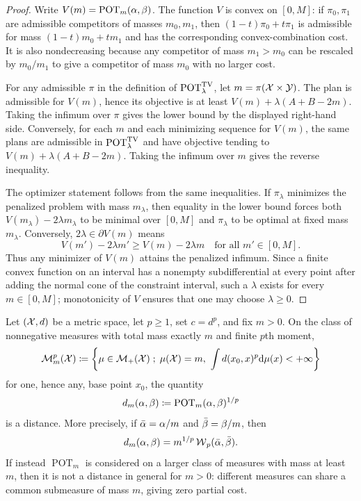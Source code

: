 \begin{proof}
	Write $V(m)=\operatorname{POT}_m(\alpha,\beta)$. The function $V$ is convex on $[0,M]$: if $\pi_0,\pi_1$ are admissible competitors of masses $m_0,m_1$, then $(1-t)\pi_0+t\pi_1$ is admissible for mass $(1-t)m_0+tm_1$ and has the corresponding convex-combination cost. It is also nondecreasing because any competitor of mass $m_1>m_0$ can be rescaled by $m_0/m_1$ to give a competitor of mass $m_0$ with no larger cost.

	For any admissible $\pi$ in the definition of $\operatorname{POT}^{\operatorname{TV}}_\lambda$, let $m=\pi(\mathcal{X}\times\mathcal{Y})$. The plan is admissible for $V(m)$, hence its objective is at least $V(m)+\lambda(A+B-2m)$. Taking the infimum over $\pi$ gives the lower bound by the displayed right-hand side. Conversely, for each $m$ and each minimizing sequence for $V(m)$, the same plans are admissible in $\operatorname{POT}^{\operatorname{TV}}_\lambda$ and have objective tending to $V(m)+\lambda(A+B-2m)$. Taking the infimum over $m$ gives the reverse inequality.

	The optimizer statement follows from the same inequalities. If $\pi_\lambda$ minimizes the penalized problem with mass $m_\lambda$, then equality in the lower bound forces both $V(m_\lambda)-2\lambda m_\lambda$ to be minimal over $[0,M]$ and $\pi_\lambda$ to be optimal at fixed mass $m_\lambda$. Conversely, $2\lambda\in\partial V(m)$ means
	\[
		V(m')-2\lambda m'\geq V(m)-2\lambda m
		\quad\text{for all }m'\in[0,M].
	\]
	Thus any minimizer of $V(m)$ attains the penalized infimum. Since a finite convex function on an interval has a nonempty subdifferential at every point after adding the normal cone of the constraint interval, such a $\lambda$ exists for every $m\in[0,M]$; monotonicity of $V$ ensures that one may choose $\lambda\geq0$.
\end{proof}

\begin{prop}\label{prop-partial-ot-metric-slice}
	Let $(\mathcal{X},d)$ be a metric space, let $p\geq1$, set $c=d^p$, and fix $m>0$. On the class of nonnegative measures with total mass exactly $m$ and finite $p$th moment,
	\[
		\mathcal M_m^p(\mathcal{X})\coloneqq
		\left\{ \mu\in\mathcal{M}_+(\mathcal{X}) \;;\; \mu(\mathcal{X})=m,\ \int d(x_0,x)^p\mathrm{d}\mu(x)<+\infty \right\}
	\]
	for one, hence any, base point $x_0$, the quantity
	\[
		d_m(\alpha,\beta)\coloneqq \operatorname{POT}_m(\alpha,\beta)^{1/p}
	\]
	is a distance. More precisely, if $\bar{\alpha}=\alpha/m$ and $\bar{\beta}=\beta/m$, then
	\[
		d_m(\alpha,\beta)=m^{1/p}\operatorname{\mathcal{W}}_p(\bar{\alpha},\bar{\beta}).
	\]
	If instead $\operatorname{POT}_m$ is considered on a larger class of measures with mass at least $m$, then it is not a distance in general for $m>0$: different measures can share a common submeasure of mass $m$, giving zero partial cost.
\end{prop}

